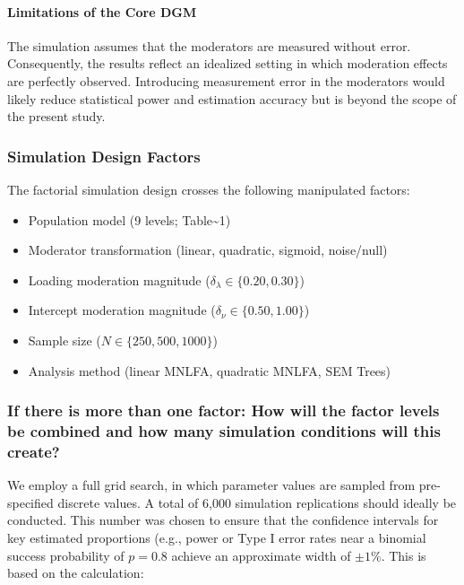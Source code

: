 \documentclass[
  man,
  floatsintext]{apa7}
\providecommand{\tightlist}{%
  \setlength{\itemsep}{0pt}\setlength{\parskip}{0pt}}
\begin{document}
\paragraph{Limitations of the Core
DGM}\label{limitations-of-the-core-dgm}

The simulation assumes that the moderators are measured without error.
Consequently, the results reflect an idealized setting in which
moderation effects are perfectly observed. Introducing measurement error
in the moderators would likely reduce statistical power and estimation
accuracy but is beyond the scope of the present study.

\subsubsection{Simulation Design
Factors}\label{simulation-design-factors}

The factorial simulation design crosses the following manipulated
factors:

\begin{itemize}
\tightlist
\item
  Population model (9 levels; Table\textasciitilde1)
\item
  Moderator transformation (linear, quadratic, sigmoid, noise/null)
\item
  Loading moderation magnitude (\(\delta_\lambda\in\{0.20,0.30\}\))
\item
  Intercept moderation magnitude (\(\delta_\nu\in\{0.50,1.00\}\))
\item
  Sample size (\(N\in\{250,500,1000\}\))
\item
  Analysis method (linear MNLFA, quadratic MNLFA, SEM Trees)
\end{itemize}

\subsubsection{If there is more than one factor: How will the factor
levels be combined and how many simulation conditions will this
create?}\label{if-there-is-more-than-one-factor-how-will-the-factor-levels-be-combined-and-how-many-simulation-conditions-will-this-create}

We employ a full grid search, in which parameter values are sampled from
pre-specified discrete values. A total of 6,000 simulation replications
should ideally be conducted. This number was chosen to ensure that the
confidence intervals for key estimated proportions (e.g., power or Type
I error rates near a binomial success probability of \(p = 0.8\) achieve
an approximate width of \(\pm 1\%\). This is based on the calculation:
\end{document}
